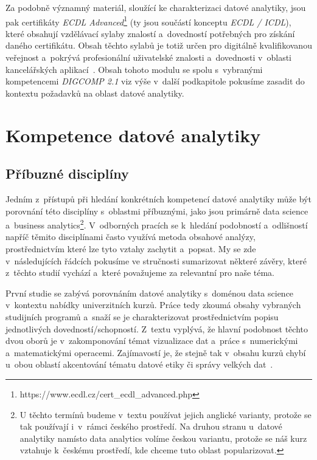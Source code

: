 Za podobně významný materiál, sloužící ke charakterizaci datové analytiky, jsou pak certifikáty \emph{ECDL Advanced}\footnote{https://www.ecdl.cz/cert\_ecdl\_advanced.php} (ty jsou součástí konceptu \emph{ECDL / ICDL}), které obsahují vzdělávací sylaby znalostí a~dovedností potřebných pro získání daného certifikátu. Obsah těchto sylabů je totiž určen pro digitálně kvalifikovanou veřejnost a~pokrývá profesionální uživatelské znalosti a~dovednosti v~oblasti kancelářských aplikací~\parencite{ecdl17}. Obsah tohoto modulu se spolu s~vybranými kompetencemi \emph{DIGCOMP 2.1} viz výše v~další podkapitole pokusíme zasadit do kontextu požadavků na oblast datové analytiky.

\hypertarget{kompetence-datovuxe9-analytiky}{%
\section{Kompetence datové analytiky}\label{kompetence-datovuxe9-analytiky}}

\hypertarget{pux159uxedbuznuxe9-discipluxedny}{%
\subsection{Příbuzné disciplíny}\label{pux159uxedbuznuxe9-discipluxedny}}

Jedním z~přístupů při hledání konkrétních kompetencí datové analytiky může být porovnání této disciplíny s~oblastmi příbuznými, jako jsou primárně data science a~business analytics\footnote{U těchto termínů budeme v~textu používat jejich anglické varianty, protože se tak používají i~v~rámci českého prostředí. Na druhou stranu u~datové analytiky namísto data analytics volíme českou variantu, protože se náš kurz vztahuje k~českému prostředí, kde chceme tuto oblast popularizovat.}. V~odborných pracích se k~hledání podobností a~odlišností napříč těmito disciplínami často využívá metoda obsahové analýzy, prostřednictvím které lze tyto vztahy zachytit a~popsat. My se zde v~následujících řádcích pokusíme ve stručnosti sumarizovat některé závěry, které z~těchto studií vychází a~které považujeme za relevantní pro naše téma.

První studie se zabývá porovnáním datové analytiky s~doménou data science v~kontextu nabídky univerzitních kurzů. Práce tedy zkoumá obsahy vybraných studijních programů a~snaží se je charakterizovat prostřednictvím popisu jednotlivých dovedností/schopností. Z~textu vyplývá, že hlavní podobnost těchto dvou oborů je v~zakomponování témat vizualizace dat a~práce s~numerickými a~matematickými operacemi. Zajímavostí je, že stejně tak v~obsahu kurzů chybí u~obou oblastí akcentování tématu datové etiky či správy velkých dat~\parencite[109]{aasheim2015}.

